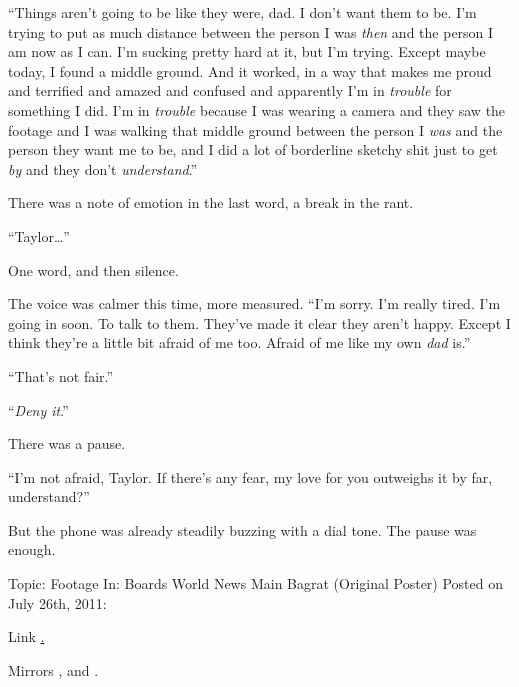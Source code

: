 ``Things aren't going to be like they were, dad.  I don't want them to be.  I'm trying to put as much distance between the person I was \emph{then} and the person I am now as I can.  I'm sucking pretty hard at it, but I'm trying.  Except maybe today, I found a middle ground.  And it worked, in a way that makes me proud and terrified and amazed and confused and apparently I'm in \emph{trouble} for something I did.  I'm in \emph{trouble} because I was wearing a camera and they saw the footage and I was walking that middle ground between the person I \emph{was} and the person they want me to be, and I did a lot of borderline sketchy shit just to get \emph{by} and they don't \emph{understand}.''



There was a note of emotion in the last word, a break in the rant.



``Taylor\ldots''



One word, and then silence.



The voice was calmer this time, more measured.  ``I'm sorry.  I'm really tired.  I'm going in soon.  To talk to them.  They've made it clear they aren't happy.  Except I think they're a little bit afraid of me too.  Afraid of me like my own \emph{dad} is.''



``That's not fair.''



``\emph{Deny it}.''



There was a pause.



``I'm not afraid, Taylor.  If there's any fear, my love for you outweighs it by far, understand?''



But the phone was already steadily buzzing with a dial tone.  The pause was enough.



\blacksquare



\blacklozenge  Topic:  Footage
In:  Boards \blacktriangleright World News \blacktriangleright Main
Bagrat (Original Poster)
Posted on July 26th, 2011:



Link \underline{.}



Mirrors \underline{}, \underline{} and \underline{}.



